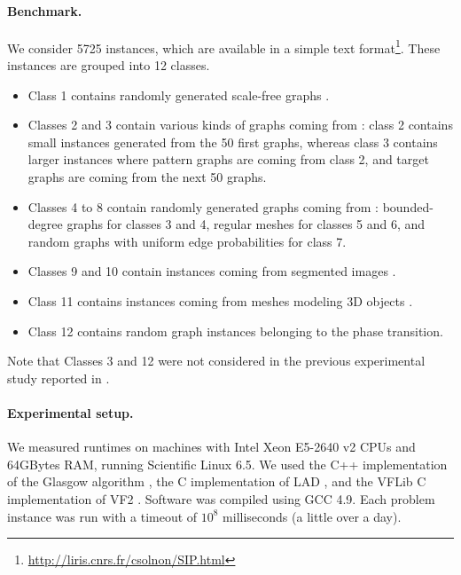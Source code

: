 \documentclass{llncs}
\begin{document}
\paragraph{Benchmark.}

We consider 5725 instances, which are available in a simple text
format\footnote{\url{http://liris.cnrs.fr/csolnon/SIP.html}}. These
instances are grouped into 12 classes.

\begin{itemize}
\item Class 1 contains randomly generated scale-free graphs \cite{constraints10}.
\item Classes 2 and 3 contain various kinds of graphs coming from \cite{LV02}: class 2 contains small
    instances generated from the 50 first graphs, whereas class 3 contains larger
    instances where pattern graphs are coming from class 2, and target graphs are coming from the
    next 50 graphs.
\item Classes 4 to 8 contain randomly generated graphs coming from
    \cite{GraphDatabase1,GraphDatabase2}: bounded-degree graphs for classes 3 and 4, regular meshes
    for classes 5 and 6, and random graphs with uniform edge probabilities for class 7.
\item Classes 9 and 10 contain instances coming from segmented images \cite{pr15,cviu11}.
\item Class 11 contains instances coming from meshes modeling 3D objects \cite{cviu11}.
\item Class 12 contains random graph instances belonging to the phase transition.
\end{itemize}

Note that Classes 3 and 12 were not considered in the previous experimental study reported in \cite{McCreesh:2015}.


\paragraph{Experimental setup.} We measured runtimes on machines with Intel Xeon E5-2640 v2 CPUs and 64GBytes RAM, running
Scientific Linux 6.5. We used the C++ implementation of the Glasgow algorithm \cite{McCreesh:2015},
the C implementation of LAD \cite{Solnon:2010}, and the VFLib C implementation of VF2
\cite{Cordella:2004}. Software was compiled using GCC 4.9. Each problem instance was run with a
timeout of $10^8$ milliseconds (a little over a day).
\end{document}
